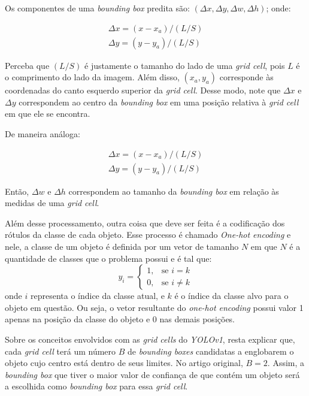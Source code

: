 Os componentes de uma \emph{bounding box} predita são: $(\Delta{x}, \Delta{y}, \Delta{w}, \Delta{h})$; onde:

\begin{align}
\Delta{x} = \left(x - x_a \right) / \left( L / S\right)\\
\Delta{y} = \left(y - y_a \right) / \left( L / S\right)
\end{align}

Perceba que $\left( L / S\right)$ é justamente o tamanho do lado de uma \emph{grid cell}, pois $L$ é o comprimento do lado da imagem. Além disso, $(x_a, y_a)$ corresponde às coordenadas do canto esquerdo superior da \emph{grid cell}. Desse modo, note que $\Delta{x}$ e $\Delta{y}$ correspondem ao centro da \emph{bounding box} em uma posição relativa à \emph{grid cell} em que ele se encontra.

De maneira análoga:

\begin{align}
\Delta{x} = \left(x - x_a \right) / \left( L / S\right)\\
\Delta{y} = \left(y - y_a \right) / \left( L / S\right)
\end{align}

Então, $\Delta{w}$ e $\Delta{h}$ correspondem ao tamanho da \emph{bounding box} em relação às medidas de uma \emph{grid cell}.

Além desse processamento, outra coisa que deve ser feita é a codificação dos rótulos da classe de cada objeto. Esse processo é chamado \emph{One-hot encoding} e nele, a classe de um objeto é definida por um vetor de tamanho $N$ em que $N$ é a quantidade de classes que o problema possui e é tal que:
\begin{equation}
y_i = 
\begin{cases} 
1, & \text{se } i = k \\
0, & \text{se } i \neq k 
\end{cases}
\end{equation}
onde $i$ representa o índice da classe atual, e $k$ é o índice da classe alvo para o objeto em questão. Ou seja, o vetor resultante do \emph{one-hot encoding} possui valor 1 apenas na posição da classe do objeto e 0 nas demais posições.

Sobre os conceitos envolvidos com as \emph{grid cells} do \emph{YOLOv1}, resta explicar que, cada \emph{grid cell} terá um número $B$ de \emph{bounding boxes} candidatas a englobarem o objeto cujo centro está dentro de seus limites. No artigo original, $B = 2$. Assim, a \emph{bounding box} que tiver o maior valor de confiança de que contém um objeto será a escolhida como \emph{bounding box} para essa \emph{grid cell}.

